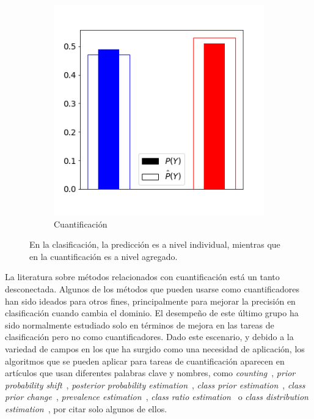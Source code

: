 \begin{figure}[h]
\begin{subfigure}[t]{0.4\textwidth}
        \includegraphics[width=\textwidth]{../plots_teoria/intro_barplot.png}
        \caption{Cuantificación}
    \end{subfigure}
    \caption{En la clasificación, la predicción es a nivel individual, mientras
    que en la cuantificación es a nivel agregado.}\label{fig:intro}
\end{figure}

La literatura sobre métodos relacionados con cuantificación está un tanto
desconectada. Algunos de los métodos que pueden usarse como cuantificadores han
sido ideados para otros fines, principalmente para mejorar la precisión en
clasificación cuando cambia el dominio. El desempeño de este último grupo ha
sido normalmente estudiado solo en términos de mejora en las tareas de
clasificación pero no como cuantificadores. Dado este escenario, y debido a la
variedad de campos en los que ha surgido como una necesidad de aplicación, los
algoritmos que se pueden aplicar para tareas de cuantificación aparecen en
artículos que usan diferentes palabras clave y nombres, como {\it
counting\/}~\cite{lewis1995evaluating}, {\it prior probability
shift\/}~\cite{moreno2012unifying, storkey2009training}, {\it posterior
probability estimation\/}~\cite{alaiz2011class}, {\it class prior
estimation\/}~\cite{du2014class, chan2006estimating, zhang2010transfer}, {\it
class prior change\/}~\cite{du2014semi}, {\it prevalence
estimation\/}~\cite{barranquero2013study}, {\it class ratio
estimation\/}~\cite{asoh2012fast} o {\it class distribution
estimation\/}~\cite{gonzalez2013class, limsetto2011handling,
xue2009quantification}, por citar solo algunos de ellos.

